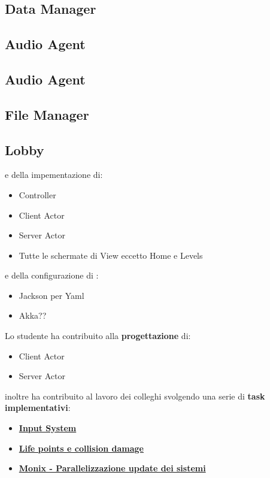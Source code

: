 \subsection{Data Manager}

\subsection{Audio Agent}
\subsection{Audio Agent}
\subsection{File Manager}
\subsection{Lobby}







e della impementazione di:

\begin{itemize}
	\item Controller
	\item Client Actor
	\item Server Actor
    \item Tutte le schermate di View eccetto Home e Levels
\end{itemize}

e della configurazione di :

\begin{itemize}
	\item Jackson per Yaml
	\item Akka??
\end{itemize}

Lo studente ha contribuito alla \textbf{progettazione} di:
\begin{itemize}
	\item Client Actor 
	\item Server Actor
\end{itemize}

inoltre ha contribuito al lavoro dei colleghi svolgendo una serie di \textbf{task implementativi}:
\begin{itemize}
	\item \hyperref[subsubsec:input_sys]{\textbf{Input System}}
	\item \hyperref[subsubsec:damage]{\textbf{Life points e collision damage}}
	\item \hyperref[subsubsec:monix_sys]{\textbf{Monix - Parallelizzazione update dei sistemi}}
\end{itemize}